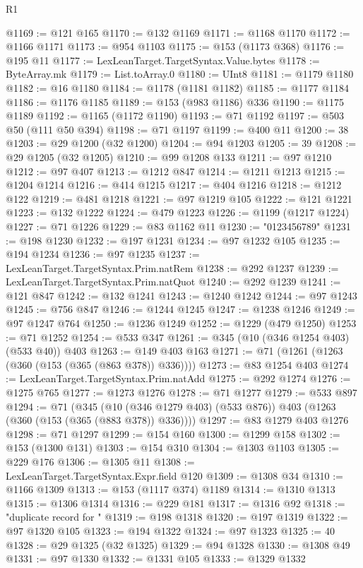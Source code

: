 \begin{lexlean}{R1}
\begin{coremodule}
{{{{{{{{{{{{{{{{{{{{{{{{{{{{{{{{{{{{{{{{{{{{{{{{{{{{{{{{{{{{{{{{{{{{{{{{{{{{{{{{{{{{{{{{{{{{{{{{{{{{{{{{{{{{{{{{{{{{{{{{{{{{{{{{{{{{{{{{{{{{{{{{{{{{{{{{{{{{{{{{{{{{{{{{{{{{{{{{{{{{{{{{{{@1169 := @121 @165
@1170 := @132 @1169
@1171 := @1168 @1170
@1172 := @1166 @1171
@1173 := @954 @1103
@1175 := @153 (@1173 @368)
@1176 := @195 @11
@1177 := LexLeanTarget.TargetSyntax.Value.bytes
@1178 := ByteArray.mk
@1179 := List.toArray.{0}
@1180 := UInt8
@1181 := @1179 @1180
@1182 := @16 @1180
@1184 := @1178 (@1181 @1182)
@1185 := @1177 @1184
@1186 := @1176 @1185
@1189 := @153 (@983 @1186) @336
@1190 := @1175 @1189
@1192 := @1165 (@1172 @1190)
@1193 := @71 @1192
@1197 := @503 @50 (@111 @50 @394)
@1198 := @71 @1197
@1199 := @400 @11
@1200 := 38
@1203 := @29 @1200 (@32 @1200)
@1204 := @94 @1203
@1205 := 39
@1208 := @29 @1205 (@32 @1205)
@1210 := @99 @1208 @133
@1211 := @97 @1210
@1212 := @97 @407
@1213 := @1212 @847
@1214 := @1211 @1213
@1215 := @1204 @1214
@1216 := @414 @1215
@1217 := @404 @1216
@1218 := @1212 @122
@1219 := @481 @1218
@1221 := @97 @1219 @105
@1222 := @121 @1221
@1223 := @132 @1222
@1224 := @479 @1223
@1226 := @1199 (@1217 @1224)
@1227 := @71 @1226
@1229 := @83 @1162 @11
@1230 := "0123456789"
@1231 := @198 @1230
@1232 := @197 @1231
@1234 := @97 @1232 @105
@1235 := @194 @1234
@1236 := @97 @1235
@1237 := LexLeanTarget.TargetSyntax.Prim.natRem
@1238 := @292 @1237
@1239 := LexLeanTarget.TargetSyntax.Prim.natQuot
@1240 := @292 @1239
@1241 := @121 @847
@1242 := @132 @1241
@1243 := @1240 @1242
@1244 := @97 @1243
@1245 := @756 @847
@1246 := @1244 @1245
@1247 := @1238 @1246
@1249 := @97 @1247 @764
@1250 := @1236 @1249
@1252 := @1229 (@479 @1250)
@1253 := @71 @1252
@1254 := @533 @347
@1261 := @345 (@10 (@346 @1254 @403) (@533 @40)) @403
@1263 := @149 @403 @163
@1271 := @71 (@1261 (@1263 (@360 (@153 (@365 (@863 @378)) @336))))
@1273 := @83 @1254 @403
@1274 := LexLeanTarget.TargetSyntax.Prim.natAdd
@1275 := @292 @1274
@1276 := @1275 @765
@1277 := @1273 @1276
@1278 := @71 @1277
@1279 := @533 @897
@1294 := @71
    (@345 (@10 (@346 @1279 @403) (@533 @876)) @403 (@1263 (@360 (@153 (@365 (@883 @378)) @336))))
@1297 := @83 @1279 @403 @1276
@1298 := @71 @1297
@1299 := @154 @160
@1300 := @1299 @158
@1302 := @153 (@1300 @131)
@1303 := @154 @310
@1304 := @1303 @1103
@1305 := @229 @176
@1306 := @1305 @11
@1308 := LexLeanTarget.TargetSyntax.Expr.field @120
@1309 := @1308 @34
@1310 := @1166 @1309
@1313 := @153 (@1117 @374) @1189
@1314 := @1310 @1313
@1315 := @1306 @1314
@1316 := @229 @181
@1317 := @1316 @92
@1318 := "duplicate record for "
@1319 := @198 @1318
@1320 := @197 @1319
@1322 := @97 @1320 @105
@1323 := @194 @1322
@1324 := @97 @1323
@1325 := 40
@1328 := @29 @1325 (@32 @1325)
@1329 := @94 @1328
@1330 := @1308 @49
@1331 := @97 @1330
@1332 := @1331 @105
@1333 := @1329 @1332
}}}}}}}}}}}}}}}}}}}}}}}}}}}}}}}}}}}}}}}}}}}}}}}}}}}}}}}}}}}}}}}}}}}}}}}}}}}}}}}}}}}}}}}}}}}}}}}}}}}}}}}}}}}}}}}}}}}}}}}}}}}}}}}}}}}}}}}}}}}}}}}}}}}}}}}}}}}}}}}}}}}}}}}}}}}}}}}}}}}}}}}}}}
\end{coremodule}
\end{lexlean}
